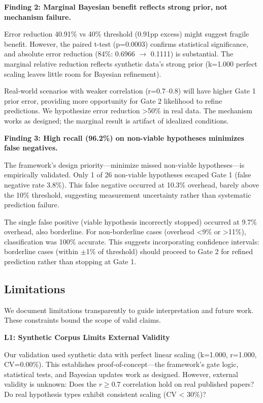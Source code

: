 \textbf{Finding 2: Marginal Bayesian benefit reflects strong prior, not mechanism failure.}

Error reduction 40.91\% vs 40\% threshold (0.91pp excess) might suggest fragile benefit. However, the paired t-test (p=0.0003) confirms statistical significance, and absolute error reduction (84\%: 0.6966 $\rightarrow$ 0.1111) is substantial. The marginal relative reduction reflects synthetic data's strong prior (k=1.000 perfect scaling leaves little room for Bayesian refinement).

Real-world scenarios with weaker correlation (r=0.7--0.8) will have higher Gate 1 prior error, providing more opportunity for Gate 2 likelihood to refine predictions. We hypothesize error reduction >50\% in real data. The mechanism works as designed; the marginal result is artifact of idealized conditions.

\textbf{Finding 3: High recall (96.2\%) on non-viable hypotheses minimizes false negatives.}

The framework's design priority---minimize missed non-viable hypotheses---is empirically validated. Only 1 of 26 non-viable hypotheses escaped Gate 1 (false negative rate 3.8\%). This false negative occurred at 10.3\% overhead, barely above the 10\% threshold, suggesting measurement uncertainty rather than systematic prediction failure.

The single false positive (viable hypothesis incorrectly stopped) occurred at 9.7\% overhead, also borderline. For non-borderline cases (overhead <9\% or >11\%), classification was 100\% accurate. This suggests incorporating confidence intervals: borderline cases (within $\pm$1\% of threshold) should proceed to Gate 2 for refined prediction rather than stopping at Gate 1.

\subsection{Limitations}

We document limitations transparently to guide interpretation and future work. These constraints bound the scope of valid claims.

\textbf{L1: Synthetic Corpus Limits External Validity}

Our validation used synthetic data with perfect linear scaling (k=1.000, r=1.000, CV=0.00\%). This establishes proof-of-concept---the framework's gate logic, statistical tests, and Bayesian updates work as designed. However, external validity is unknown: Does the $r \geq 0.7$ correlation hold on real published papers? Do real hypothesis types exhibit consistent scaling (CV < 30\%)?

